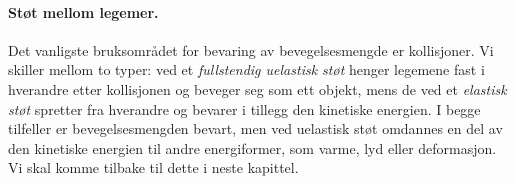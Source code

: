 
\paragraph*{Støt mellom legemer.}
Det vanligste bruksområdet for bevaring av bevegelsesmengde er kollisjoner. Vi skiller mellom to typer: ved et \textit{fullstendig uelastisk støt} henger legemene fast i hverandre etter kollisjonen og beveger seg som ett objekt, mens de ved et \textit{elastisk støt} spretter fra hverandre og bevarer i tillegg den kinetiske energien. I begge tilfeller er bevegelsesmengden bevart, men ved uelastisk støt omdannes en del av den kinetiske energien til andre energiformer, som varme, lyd eller deformasjon. Vi skal komme tilbake til dette i neste kapittel.


